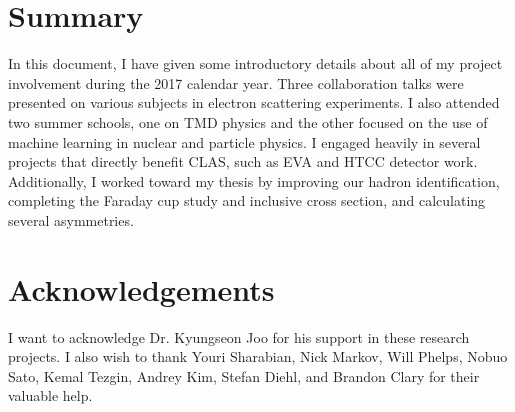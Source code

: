 \section{Summary}
In this document, I have given some introductory details about all of my project involvement during the 2017 calendar year.  Three collaboration talks were presented on various subjects in electron scattering experiments.  I also attended two summer schools, one on TMD physics and the other focused on the use of machine learning in nuclear and particle physics.  I engaged heavily in several projects that directly benefit CLAS, such as EVA and HTCC detector work.  Additionally, I worked toward my thesis by improving our hadron identification, completing the Faraday cup study and inclusive cross section, and calculating several asymmetries.  

%
%
\section{Acknowledgements}
I want to acknowledge Dr. Kyungseon Joo for his support in these research projects.  I also wish to thank Youri Sharabian, Nick Markov, Will Phelps, Nobuo Sato, Kemal Tezgin, Andrey Kim, Stefan Diehl, and Brandon Clary for their valuable help.  

